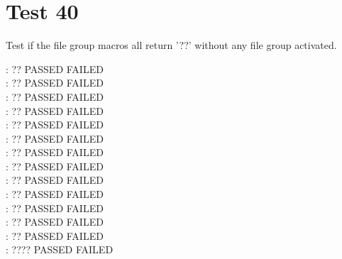 \documentclass[12pt]{report}
\begin{document}
\chapter{Test 40}
Test if the file group macros all return '??' without any file group activated.

\def\qq{??}

\def\testqq#1{%
\edef\testarg{#1}
\noindent\string#1:
\ifx\testarg\qq
PASSED
\else
FAILED
\show\testarg\error{#1}\fi%
\\
}

\testqq{\svncgrev}
\testqq{\svncgdate}
\testqq{\svncgauthor}
\testqq{\svncgyear}
\testqq{\svncgmonth}
\testqq{\svncgday}
\testqq{\svncghour}
\testqq{\svncgminute}
\testqq{\svncgsecond}
\testqq{\svncgtimezonehour}
\testqq{\svncgtimezoneminute}

\testqq{\svncgtoday}

\testqq{\svng{}{}}

\def\qq{????}
\testqq{\svncgtimezone}
\end{document}
